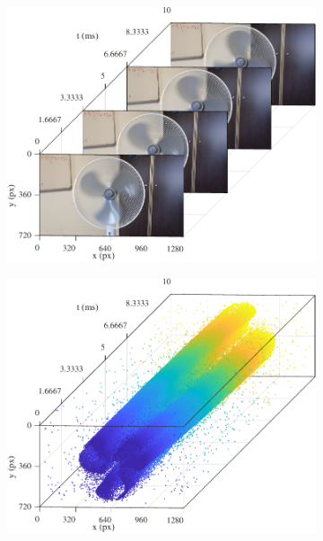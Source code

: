 \begin{figure}
  \centering
  \begin{subfigure}{0.475\linewidth}
    \centering
    \includegraphics[width=\linewidth]{mainmatter/figures/2_event_cameras/fan_rgb_vs_evts/fan_rgb/plotted_frames.pdf}
    \caption{}\label{subfig:evtcams:fan_rgb_vs_evts:rgb}
  \end{subfigure}
  \begin{subfigure}{0.475\linewidth}
    \centering
    \includegraphics[width=\linewidth]{mainmatter/figures/2_event_cameras/fan_rgb_vs_evts/fan_evts/plotted_events.pdf}

\end{subfigure}
\end{figure}
